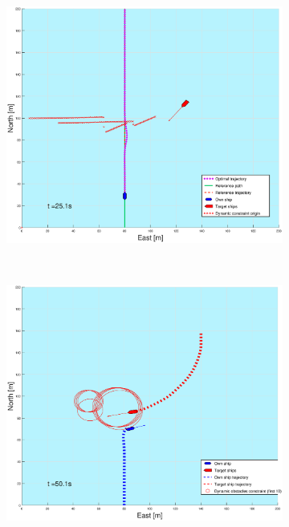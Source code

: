 \begin{figure}[!b]
    \hfill
    \begin{subfigure}[b]{0.499\textwidth}
        \centering
        \includegraphics[width=\textwidth]{Images/Figures/sving_GW/_Simple_0fig999_time=25}
    \end{subfigure}
    \hfill
    \\
    \begin{subfigure}[b]{0.49\textwidth}
        \centering
        \includegraphics[width=\textwidth]{Images/Figures/sving_GW/_Simple_0fig1_time=50}

\end{subfigure}
\end{figure}
